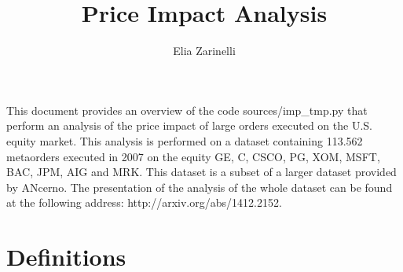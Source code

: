 \documentclass[12pt]{article}
\title{Price Impact Analysis}
\author{Elia Zarinelli}
\begin{document}
\maketitle






This document provides an overview of the code \textsf{sources/imp\_tmp.py} that perform an analysis of the price impact of large orders executed on the U.S. equity market. This analysis is performed on a dataset containing 113.562 metaorders executed in 2007 on the equity GE, C, CSCO, PG, XOM, MSFT, BAC, JPM, AIG and MRK. This dataset is a subset of a larger dataset provided by ANcerno. The presentation of the analysis of the whole dataset can be found at the following address: http://arxiv.org/abs/1412.2152.

\section{Definitions}
\end{document}
